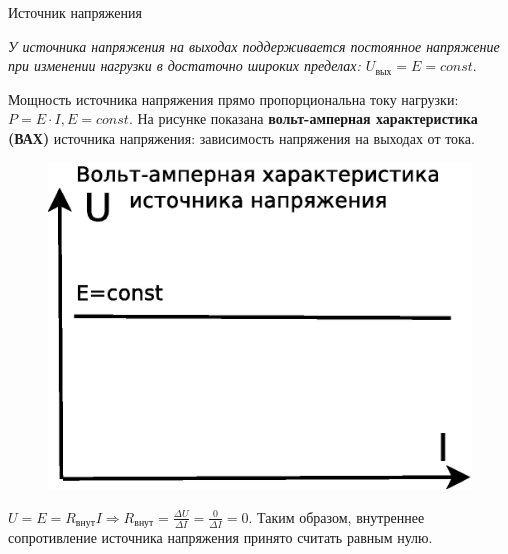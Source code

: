 \documentclass[12pt, pdf, hyperref={unicode},handout]{beamer}
\begin{document}
\begin{frame}{ Источник напряжения}
  \begin{block}

    \small{
      \textit{У источника напряжения на выходах поддерживается постоянное напряжение при изменении нагрузки в достаточно широких пределах: $U_{\text{вых}}=E=const.$}

      Мощность источника напряжения прямо пропорциональна току нагрузки: $P=E\cdot I, E=const.$ На рисунке показана \textbf{вольт-амперная характеристика (ВАХ)} источника напряжения: зависимость напряжения на выходах  от тока.
      \begin{figure}[htb] 
    \centering
    \includegraphics [scale=0.7]{ris3.eps}
  \end{figure}
  $U=E=R_{\text{внут}}I\Rightarrow R_{\text{внут}}=\frac{\Delta U}{\Delta I}=\frac{0}{\Delta I}=0$. Таким образом, внутреннее сопротивление источника напряжения принято считать равным нулю.

  
}

  \end{block}
  
\end{frame}
\end{document}
